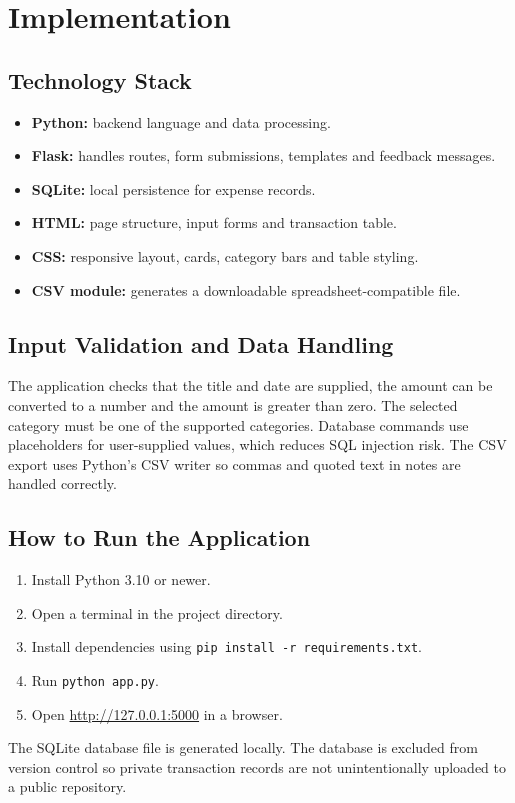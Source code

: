 \documentclass[11pt,a4paper]{report}
\begin{document}
\section{Implementation}
\subsection{Technology Stack}
\begin{itemize}[leftmargin=*]
\item \textbf{Python:} backend language and data processing.
\item \textbf{Flask:} handles routes, form submissions, templates and feedback messages.
\item \textbf{SQLite:} local persistence for expense records.
\item \textbf{HTML:} page structure, input forms and transaction table.
\item \textbf{CSS:} responsive layout, cards, category bars and table styling.
\item \textbf{CSV module:} generates a downloadable spreadsheet-compatible file.
\end{itemize}

\subsection{Input Validation and Data Handling}
The application checks that the title and date are supplied, the amount can be converted to a number and the amount is greater than zero. The selected category must be one of the supported categories. Database commands use placeholders for user-supplied values, which reduces SQL injection risk. The CSV export uses Python's CSV writer so commas and quoted text in notes are handled correctly.

\subsection{How to Run the Application}
\begin{enumerate}[leftmargin=*]
\item Install Python 3.10 or newer.
\item Open a terminal in the project directory.
\item Install dependencies using \texttt{pip install -r requirements.txt}.
\item Run \texttt{python app.py}.
\item Open \url{http://127.0.0.1:5000} in a browser.
\end{enumerate}
The SQLite database file is generated locally. The database is excluded from version control so private transaction records are not unintentionally uploaded to a public repository.
\end{document}
